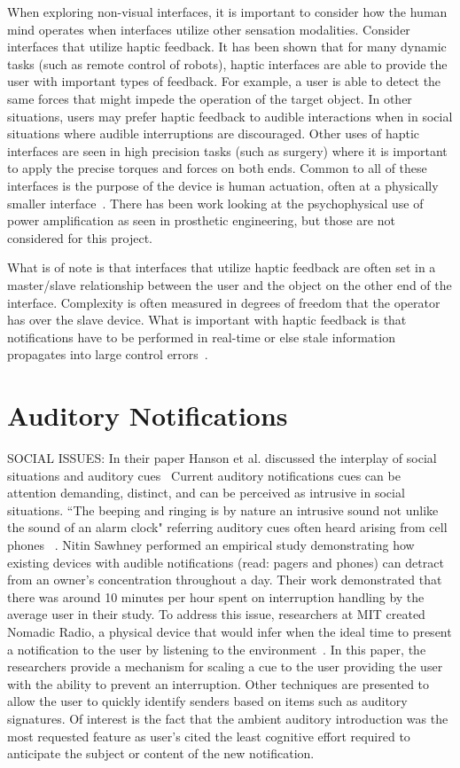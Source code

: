 When exploring non-visual interfaces, it is important to consider how the human
mind operates when interfaces utilize other sensation modalities. Consider
interfaces that utilize haptic feedback.  It has been shown that for many
dynamic tasks (such as remote control of robots), haptic interfaces are able to
provide the user with important types of feedback.  For example, a user is able
to detect the same forces that might impede the operation of the target object.
In other situations, users may prefer haptic feedback to audible interactions
when in social situations where audible interruptions are discouraged.  Other
uses of haptic interfaces are seen in high precision tasks (such as surgery)
where it is important to apply the precise torques and forces on both ends.
Common to all of these interfaces is the purpose of the device is human
actuation, often at a physically smaller interface~\cite{ellis1996design}.
There has been work looking at the psychophysical use of power amplification
as seen in prosthetic engineering, but those are not considered for this
project.

What is of note is that interfaces that utilize haptic feedback are often set in
a master/slave relationship between the user and the object on the other end of
the interface. Complexity is often measured in degrees of freedom that the
operator has over the slave device.  What is important with haptic feedback is
that notifications have to be performed in real-time or else stale information
propagates into large control errors~\cite{ellis1996design}.

\section{                  Auditory Notifications                            }

SOCIAL ISSUES: In their paper Hanson et al. discussed the interplay of social
situations and auditory cues~\cite{hansson2001subtle} Current auditory
notifications cues can be attention demanding, distinct, and can be perceived as
intrusive in social situations. ``The beeping and ringing is by nature an
intrusive sound not unlike the sound of an alarm clock" referring auditory cues
often heard arising from cell phones  ~\cite{hansson2001subtle}.  Nitin Sawhney
performed an empirical study demonstrating how existing devices with audible
notifications (read: pagers and phones) can detract from an owner's
concentration throughout a day.  Their work demonstrated that there was around
10 minutes per hour spent on  interruption handling by the average user in their study.
To address this issue, researchers at MIT created Nomadic Radio, a physical
device that would infer when the ideal time to present a notification to the
user by listening to the environment~\cite{sawhney1999nomadic}. In this paper,
the researchers provide a mechanism for scaling a cue to the user providing
the user with the ability to prevent an interruption. Other techniques are
presented to allow the user to quickly identify senders based on items such as
auditory signatures.  Of interest is the fact that the ambient auditory
introduction was the most requested feature as user's cited the least cognitive
effort required to anticipate the subject or content of the new notification.
